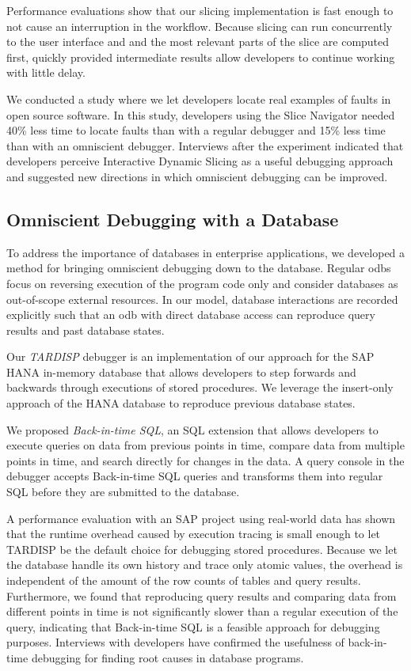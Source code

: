 Performance evaluations show that our slicing implementation is fast enough to not cause an interruption in the workflow.
Because slicing can run concurrently to the user interface and and the most relevant parts of the slice are computed first, quickly provided intermediate results allow developers to continue working with little delay.

We conducted a study where we let developers locate real examples of faults in open source software.
In this study, developers using the Slice Navigator needed 40\% less time to locate faults than with a regular debugger and 15\% less time than with an omniscient debugger.
Interviews after the experiment indicated that developers perceive Interactive Dynamic Slicing as a useful debugging approach and suggested new directions in which omniscient debugging can be improved.

\subsection{Omniscient Debugging with a Database}

To address the importance of databases in enterprise applications, we developed a method for bringing omniscient debugging down to the database.
Regular \acp{odb} focus on reversing execution of the program code only and consider databases as out-of-scope external resources.
In our model, database interactions are recorded explicitly such that an \ac{odb} with direct database access can reproduce query results and past database states.

Our \emph{TARDISP} debugger is an implementation of our approach for the SAP HANA in-memory database that allows developers to step forwards and backwards through executions of stored procedures.
We leverage the insert-only approach of the HANA database to reproduce previous database states.

We proposed \emph{Back-in-time SQL}, an SQL extension that allows developers to execute queries on data from previous points in time, compare data from multiple points in time, and search directly for changes in the data.
A query console in the debugger accepts Back-in-time SQL queries and transforms them into regular SQL before they are submitted to the database.

A performance evaluation with an SAP project using real-world data has shown that the runtime overhead caused by execution tracing is small enough to let TARDISP be the default choice for debugging stored procedures. 
Because we let the database handle its own history and trace only atomic values, the overhead is independent of the amount of the row counts of tables and query results.
Furthermore, we found that reproducing query results and comparing data from different points in time is not significantly slower than a regular execution of the query, 
indicating that Back-in-time SQL is a feasible approach for debugging purposes.
\tmpStart
Interviews with developers have confirmed the usefulness of back-in-time debugging for finding root causes in database programs.
\tmpEnd

